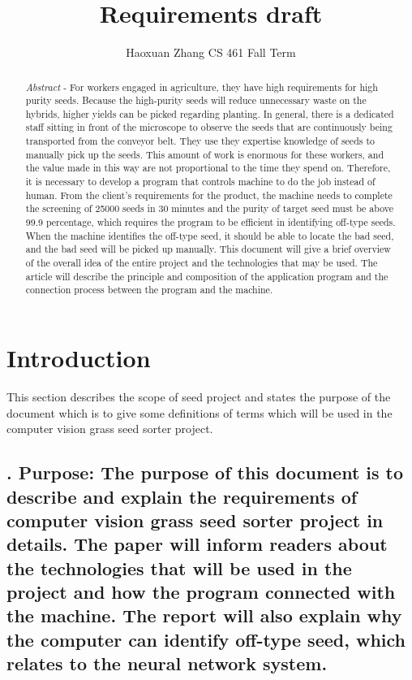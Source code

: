 \documentclass[10pt, letterpaper, twoside, draftclsnofoot, onecolumn. notitlepage]{article}
\title{Requirements draft}
\author{Haoxuan Zhang
CS 461 Fall Term}
\begin{document}
	\begin{titlepage}
		\maketitle
		\begin{abstract}
			\textit{Abstract} - For workers engaged in agriculture, they have high requirements for high purity seeds. Because the high-purity seeds will reduce unnecessary waste on the hybrids, higher yields can be picked regarding planting. In general, there is a dedicated staff sitting in front of the microscope to observe the seeds that are continuously being transported from the conveyor belt. They use they expertise knowledge of seeds to manually pick up the seeds. This amount of work is enormous for these workers, and the value made in this way are not proportional to the time they spend on. Therefore, it is necessary to develop a program that controls machine to do the job instead of human. From the client’s requirements for the product, the machine needs to complete the screening of 25000 seeds in 30 minutes and the purity of target seed must be above 99.9 percentage, which requires the program to be efficient in identifying off-type seeds. When the machine identifies the off-type seed, it should be able to locate the bad seed, and the bad seed will be picked up manually. This document will give a brief overview of the overall idea of the entire project and the technologies that may be used. The article will describe the principle and composition of the application program and the connection process between the program and the machine.
		\end{abstract}
	\end{titlepage}
\section{Introduction}
\quad This section describes the scope of seed project and states the purpose of the document which is to give some definitions of terms which will be used in the computer vision grass seed sorter project. 
\subsection{. Purpose:
The purpose of this document is to describe and explain the requirements of computer vision grass seed sorter project in details. The paper will inform readers about the technologies that will be used in the project and how the program connected with the machine. The report will also explain why the computer can identify off-type seed, which relates to the neural network system. }
\end{document}
